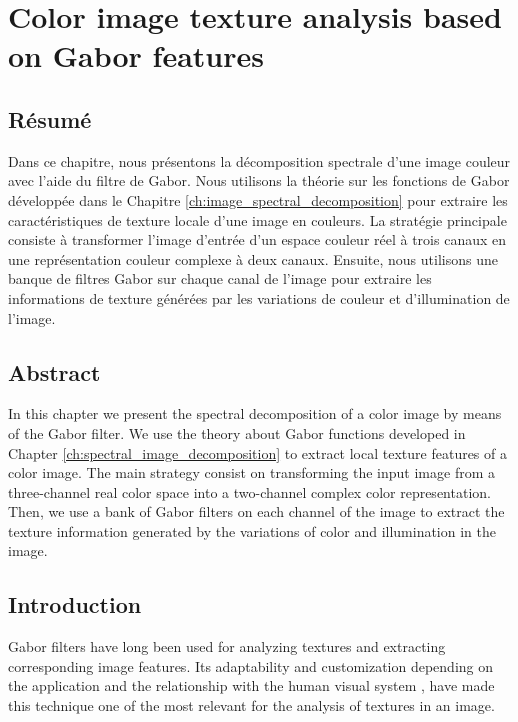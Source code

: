
\chapter{Color image texture analysis based on Gabor features}\label{ch:complex_spectral_image_decomposition}
\section*{Résumé}
\noindent Dans ce chapitre, nous présentons la décomposition spectrale d'une image couleur avec l'aide du filtre de Gabor. Nous utilisons la théorie sur les fonctions de Gabor développée dans le Chapitre \ref{ch:image_spectral_decomposition} pour extraire les caractéristiques de texture locale d'une image en couleurs. La stratégie principale consiste à transformer l'image d'entrée d'un espace couleur réel à trois canaux en une représentation couleur complexe à deux canaux. Ensuite, nous utilisons une banque de filtres Gabor sur chaque canal de l'image pour extraire les informations de texture générées par les variations de couleur et d'illumination de l'image.

\section*{Abstract}
\noindent In this chapter we present the spectral decomposition of a color image by means of the Gabor filter. We use the theory about Gabor functions developed in Chapter \ref{ch:spectral_image_decomposition} to extract local texture features of a color image. The main strategy consist on transforming the input image from a three-channel real color space into a two-channel complex color representation. Then, we use a bank of Gabor filters on each channel of the image to extract the texture information generated by the variations of color and illumination in the image.

\section{Introduction}

Gabor filters have long been used for analyzing textures and extracting corresponding image features. Its adaptability and customization depending on the application and the relationship with the human visual system \citep{Daugman:JOSA:1985a}, have made this technique one of the most relevant for the analysis of textures in an image.

